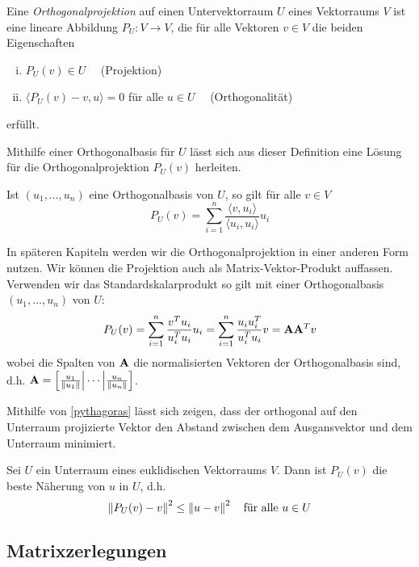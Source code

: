 \begin{defn}
Eine \textit{Orthogonalprojektion} auf einen Untervektorraum $U$ eines Vektorraums $V$ ist eine lineare Abbildung $P_U \colon V \rightarrow V$, die für alle Vektoren $v\in V$ die beiden Eigenschaften
\begin{enumerate}[(i)]
\item $P_U(v) \in U \quad$   (Projektion)
\item $\langle P_U(v) - v , u \rangle = 0$ für alle $u \in U \quad$ (Orthogonalität)
\end{enumerate}
erfüllt.
\end{defn}

Mithilfe einer Orthogonalbasis für $U$ lässt sich aus dieser Definition eine Lösung für die Orthogonalprojektion $P_U(v)$ herleiten.

\begin{thm}[\ref{Anton}]
Ist $(u_1, \ldots, u_n)$ eine Orthogonalbasis von $U$, so gilt für alle $v \in V$
$$P_{U}(v) = \sum_{i=1}^n \frac{\langle v, u_i \rangle}{\langle u_i, u_i \rangle} u_i$$
\end{thm}

In späteren Kapiteln werden wir die Orthogonalprojektion in einer anderen Form nutzen. Wir können die Projektion auch als Matrix-Vektor-Produkt auffassen. Verwenden wir das Standardskalarprodukt so gilt mit einer Orthogonalbasis $(u_1, \ldots, u_n)$ von $U$:
$$P_U(v) = \sum_{i=1}^n \frac{v^T u_i}{u_i^T u_i} u_i = \sum_{i=1}^n \frac{u_i u_i^T}{u_i^T u_i}v = \mathbf{A} \mathbf{A}^T v$$
wobei die Spalten von $\mathbf{A}$ die normalisierten Vektoren der Orthogonalbasis sind, d.h. $\mathbf{A} = \left[ \frac{u_1}{\left\lVert u_1 \right\rVert} \Big\vert \cdots \Big\vert \frac{u_n}{\left\lVert u_n \right\rVert}\right]$. 

Mithilfe von \ref{pythagoras} lässt sich zeigen, dass der orthogonal auf den Unterraum projizierte Vektor den Abstand zwischen dem Ausgansvektor und dem Unterraum minimiert.

\begin{thm}[\ref{anton}]
Sei $U$ ein Unterraum eines euklidischen Vektorraums $V$. Dann ist $P_U(v)$ die beste Näherung von $u$ in $U$, d.h.
$$\left\lVert P_U(v) - v \right\rVert^2 \leq \left\lVert u - v \right\rVert^2 \quad \text{für alle } u \in U$$
\end{thm}


\subsection{Matrixzerlegungen}

